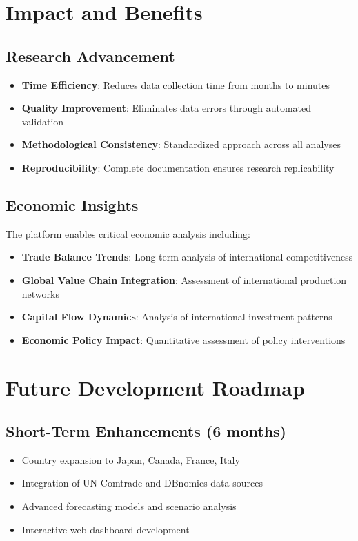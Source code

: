 \documentclass[11pt,a4paper]{article}
\begin{document}
\section{Impact and Benefits}

\subsection{Research Advancement}
\begin{itemize}
    \item \textbf{Time Efficiency}: Reduces data collection time from months to minutes
    \item \textbf{Quality Improvement}: Eliminates data errors through automated validation
    \item \textbf{Methodological Consistency}: Standardized approach across all analyses
    \item \textbf{Reproducibility}: Complete documentation ensures research replicability
\end{itemize}

\subsection{Economic Insights}
The platform enables critical economic analysis including:

\begin{itemize}
    \item \textbf{Trade Balance Trends}: Long-term analysis of international competitiveness
    \item \textbf{Global Value Chain Integration}: Assessment of international production networks
    \item \textbf{Capital Flow Dynamics}: Analysis of international investment patterns
    \item \textbf{Economic Policy Impact}: Quantitative assessment of policy interventions
\end{itemize}

\section{Future Development Roadmap}

\subsection{Short-Term Enhancements (6 months)}
\begin{itemize}
    \item Country expansion to Japan, Canada, France, Italy
    \item Integration of UN Comtrade and DBnomics data sources
    \item Advanced forecasting models and scenario analysis
    \item Interactive web dashboard development
\end{itemize}
\end{document}
